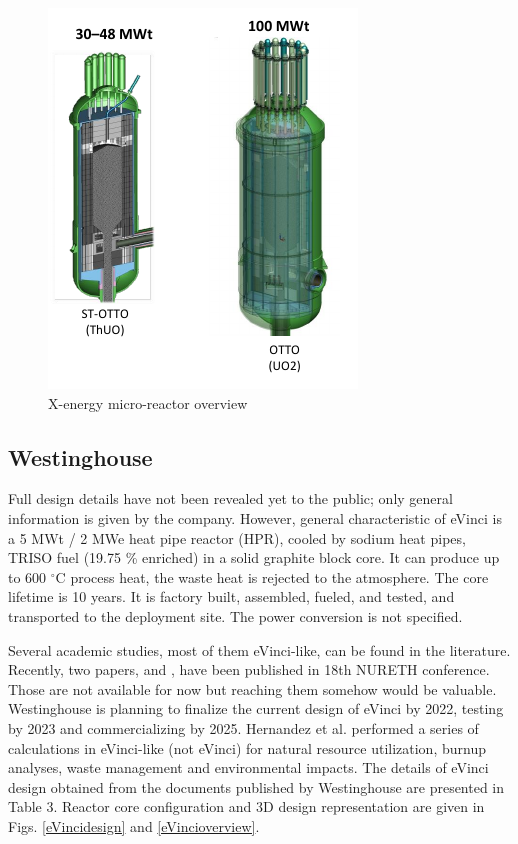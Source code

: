 \begin{figure}[hbtp]
\centering
\includegraphics[scale=0.97]{Figs/xoverview.jpeg}
\caption{X-energy micro-reactor overview}
\label{xo}
\end{figure} 

\subsection{Westinghouse}
Full design details have not been revealed yet to the public; only general information is given by the company. However, general characteristic of eVinci is a 5 MWt / 2 MWe heat pipe reactor (HPR), cooled by sodium heat pipes, TRISO fuel (19.75 \% enriched) in  a  solid graphite block  core. It  can  produce  up  to  600 $^\circ{}$C  process  heat, the  waste  heat  is  rejected  to  the atmosphere.  The  core lifetime is 10 years.  It  is  factory  built,  assembled,  fueled,  and  tested, and transported to  the deployment site. The power conversion is not specified.

Several academic studies, most of them eVinci-like, can be found in the literature. Recently, two papers, \cite{hong_thermal_2019} and \cite{wright_phenomena_2019}, have been published in 18th \gls{NURETH} conference. Those are not available for now but reaching them somehow would be valuable. Westinghouse is planning to finalize the current design of eVinci by 2022, testing by 2023 and commercializing by 2025. Hernandez et al. \cite{hernandez_micro_2019} performed a series of calculations in eVinci-like (not eVinci) for natural resource utilization, burnup analyses, waste management and environmental impacts. The details of eVinci design obtained from the documents published by Westinghouse are presented in Table 3. Reactor core configuration and 3D design representation are given in Figs. \ref{eVincidesign} and \ref{eVincioverview}.

